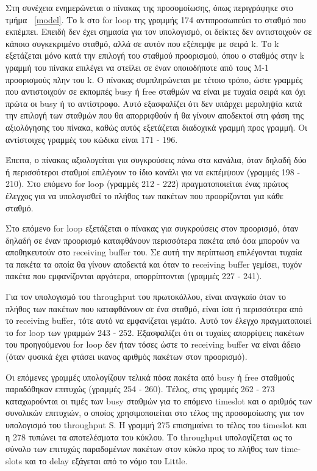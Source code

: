 \documentclass[12pt]{report}
\begin{document}
Στη συνέχεια ενημερώνεται ο πίνακας της προσομοίωσης, όπως περιγράφηκε στο τμήμα ~\ref{model}. Το \textlatin{k} στο \textlatin{for loop} της γραμμής 174 αντιπροσωπεύει το σταθμό που εκπέμπει. Επειδή δεν έχει σημασία για τον υπολογισμό, οι δείκτες δεν αντιστοιχούν σε κάποιο συγκεκριμένο σταθμό, αλλά σε αυτόν που εξέπεμψε με σειρά \textlatin{k}. Το \textlatin{k} εξετάζεται μόνο κατά την επιλογή του σταθμού προορισμού, όπου ο σταθμός στην \textlatin{k} γραμμή του πίνακα επιλέγει να στείλει σε έναν οποιοδήποτε από τους \textlatin{M-1} προορισμούς πλην του \textlatin{k}. Ο πίνακας συμπληρώνεται με τέτοιο τρόπο, ώστε γραμμές που αντιστοιχούν σε εκπομπές \textlatin{busy} ή \textlatin{free} σταθμών να είναι με τυχαία σειρά και όχι πρώτα οι \textlatin{busy} ή το αντίστροφο. Αυτό εξασφαλίζει ότι δεν υπάρχει μεροληψία κατά την επιλογή των σταθμών που θα απορριφθούν ή θα γίνουν αποδεκτοί στη φάση της αξιολόγησης του πίνακα, καθώς αυτός εξετάζεται διαδοχικά γραμμή προς γραμμή. Οι αντίστοιχες γραμμές του κώδικα είναι 171 - 196.

Έπειτα, ο πίνακας αξιολογείται για συγκρούσεις πάνω στα κανάλια, όταν δηλαδή δύο ή περισσότεροι σταθμοί επιλέγουν το ίδιο κανάλι για να εκπέμψουν (γραμμές 198 - 210). Στο επόμενο \textlatin{for loop} (γραμμές 212 - 222) πραγματοποιείται ένας πρώτος έλεγχος για να υπολογισθεί το πλήθος των πακέτων που προορίζονται για κάθε σταθμό.

Στο επόμενο \textlatin{for loop} εξετάζεται ο πίνακας για συγκρούσεις στον προορισμό, όταν δηλαδή σε έναν προορισμό καταφθάνουν περισσότερα πακέτα από όσα μπορούν να αποθηκευτούν στο \textlatin{receiving buffer} του. Σε αυτή την περίπτωση επιλέγονται τυχαία τα πακέτα τα οποία θα γίνουν αποδεκτά και όταν το \textlatin{receiving buffer} γεμίσει, τυχόν πακέτα που εμφανίζονται αργότερα, απορρίπτονται (γραμμές 227 - 241).

Για τον υπολογισμό του \textlatin{throughput} του πρωτοκόλλου, είναι αναγκαίο όταν το πλήθος των πακέτων που καταφθάνουν σε ένα σταθμό, είναι ίσα ή περισσότερα από το \textlatin{receiving buffer}, τότε αυτό να εμφανίζεται γεμάτο. Αυτό τον έλεγχο πραγματοποιεί το \textlatin{for loop} των γραμμών 243 - 252. Εξασφαλίζει ότι οι τυχαίες απορρίψεις πακέτων του προηγούμενου \textlatin{for loop} δεν ήταν τόσες ώστε το \textlatin{receiving buffer} να είναι άδειο (όταν φυσικά έχει φτάσει ικανος αριθμός πακέτων στον προορισμό).

Οι επόμενες γραμμές υπολογίζουν τελικά πόσα πακέτα από \textlatin{busy} ή \textlatin{free} σταθμούς παραδόθηκαν επιτυχώς (γραμμές 254 - 260). Τέλος, στις γραμμές 262 - 273 καταχωρούνται οι τιμές των \textlatin{busy} σταθμών για το επόμενο \textlatin{timeslot} και ο αριθμός των συνολικών επιτυχιών, ο οποίος χρησιμοποιείται στο τέλος της προσομοίωσης για τον υπολογισμό του \textlatin{throughput S}. Η γραμμή 275 επισημαίνει το τέλος του \textlatin{timeslot} και η 278 τυπώνει τα αποτελέσματα του κύκλου. Το \textlatin{throughput} υπολογίζεται ως το σύνολο των επιτυχώς παραδομένων πακέτων στον κύκλο προς το πλήθος των \textlatin{timeslots} και το \textlatin{delay} εξάγεται από το νόμο του \textlatin{Little}.
\end{document}
